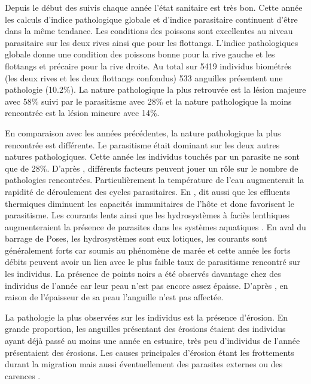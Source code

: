 \documentclass[11pt,titlepage,twoside]{article}\usepackage[]{graphicx}\usepackage[table]{xcolor}
\begin{document}
\vspace{0.5cm}
Depuis le début des suivis chaque année l’état sanitaire est très bon. Cette année les calculs d’indice pathologique globale et d’indice parasitaire continuent d’être dans la même tendance. Les conditions des poissons sont excellentes au niveau parasitaire sur les deux rives ainsi que pour les flottangs. L’indice pathologiques globale donne une condition des poissons bonne pour la rive gauche et les flottangs et précaire pour la rive droite. Au total sur 5419 individus biométrés (les deux rives et les deux flottangs confondus) 533 anguilles présentent une pathologie (10.2\%). La nature pathologique la plus retrouvée est la lésion majeure avec 58\% suivi par le parasitisme avec 28\% et la nature pathologique la moins rencontrée est la lésion mineure avec 14\%.

\vspace{0.5cm}
En comparaison avec les années précédentes, la nature pathologique la plus rencontrée est différente. Le parasitisme était dominant sur les deux autres natures pathologiques. Cette année les individus touchés par un parasite ne sont que de 28\%.  D’après \citep{elie_sante_2014}, différents facteurs peuvent jouer un rôle sur le nombre de pathologies rencontrées. Particulièrement la température de l’eau augmenterait la rapidité de déroulement des cycles parasitaires. En \citep{lafferty_how_1999},  dit aussi que les effluents thermiques diminuent les capacités immunitaires de l’hôte et donc favorisent le parasitisme. Les courants lents ainsi que les hydrosystèmes à faciès lenthiques augmenteraient la présence de parasites dans les systèmes aquatiques \citep{berra_incidence_1978,janovy_evolutionary_1997}. En aval du barrage de Poses, les hydrosystèmes sont eux lotiques, les courants sont généralement forts car soumis au phénomène de marée et cette année les forts débits peuvent avoir un lien avec le plus faible taux de parasitisme rencontré sur les individus. La présence de points noirs a été observés davantage chez des individus de l’année car leur peau n’est pas encore assez épaisse. D’après \citep{elie_sante_2014}, en raison de l’épaisseur de sa peau l’anguille n’est pas affectée.  

\vspace{0.5cm}
La pathologie la plus observées sur les individus est la présence d’érosion. En grande proportion, les anguilles présentant des érosions étaient des individus ayant déjà passé au moins une année en estuaire, très peu d’individus de l’année présentaient des érosions. Les causes principales d’érosion étant les frottements durant la migration mais aussi éventuellement des parasites externes ou des carences \citep{elie_sante_2014}.  
\end{document}
